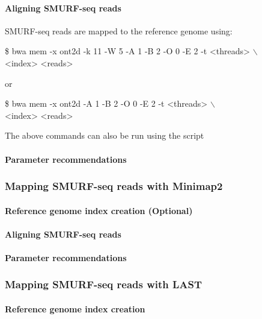 \documentclass[11pt]{article}
\newenvironment{cmd}
{\par \noindent \ttfamily \$}
{\par \noindent}
\begin{document}
\paragraph{Aligning SMURF-seq reads}
SMURF-seq reads are mapped to the reference genome using:
\begin{cmd}
  bwa mem -x ont2d -k 11 -W 5 -A 1 -B 2 -O 0 -E 2 -t <threads> $\backslash$ \\
  <index> <reads>
\end{cmd}
or
\begin{cmd}
  bwa mem -x ont2d -A 1 -B 2 -O 0 -E 2 -t <threads> $\backslash$ \\
  <index> <reads>
\end{cmd}

The above commands can also be run using the script



\paragraph{Parameter recommendations}



\subsubsection{Mapping SMURF-seq reads with Minimap2}
\label{minimap}
\paragraph{Reference genome index creation (Optional)}

\paragraph{Aligning SMURF-seq reads}

\paragraph{Parameter recommendations}



\subsubsection{Mapping SMURF-seq reads with LAST}
\label{last}
\paragraph{Reference genome index creation}
\end{document}
